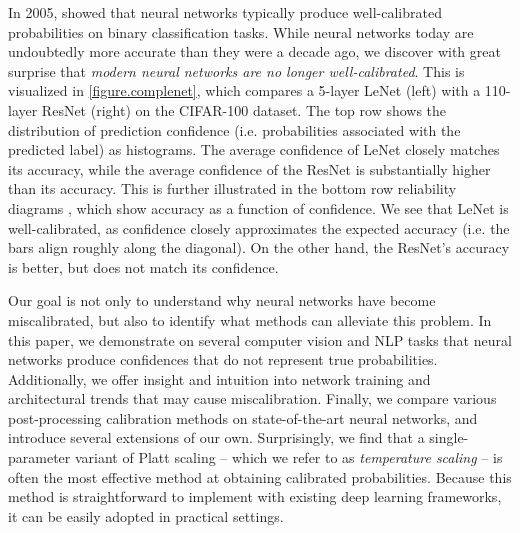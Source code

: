 In 2005, \citet{niculescu2005predicting} showed that neural networks typically produce well-calibrated probabilities on binary classification tasks. While neural networks today are undoubtedly more accurate than they were a decade ago,
we discover with great surprise that \emph{modern neural networks are no longer well-calibrated}.
This is visualized in \autoref{figure.complenet}, which compares a 5-layer LeNet (left) \cite{lecun1998gradient} with a 110-layer ResNet (right) \cite{he2015deep} on the CIFAR-100 dataset.
The top row shows the distribution of prediction confidence (i.e. probabilities associated with the predicted label) as histograms.
The average confidence of LeNet closely matches its accuracy, while the average confidence of the ResNet is substantially higher than its accuracy.
This is further illustrated in the bottom row reliability diagrams \cite{degroot1983comparison,niculescu2005predicting}, which show accuracy as a function of confidence. We see that LeNet is well-calibrated, as confidence closely approximates the expected accuracy (i.e. the bars align roughly along the diagonal). On the other hand, the ResNet's accuracy is better, but does not match its confidence.

Our goal is not only to understand why neural networks have become miscalibrated, but also to identify what methods can alleviate this problem.
%
In this paper, we demonstrate on several computer vision and NLP tasks that neural networks produce confidences that do not represent true probabilities.
%
Additionally, we offer insight and intuition into network training and architectural trends that may cause miscalibration.
%
Finally, we compare various post-processing calibration methods on state-of-the-art neural networks, and introduce several extensions of our own. Surprisingly, we find that a single-parameter variant of Platt scaling \cite{platt1999probabilistic} -- which we refer to as \emph{temperature scaling} -- is often the most effective method at obtaining calibrated probabilities. Because this method is straightforward to implement with existing deep learning frameworks, it can be easily adopted in practical settings.
%
